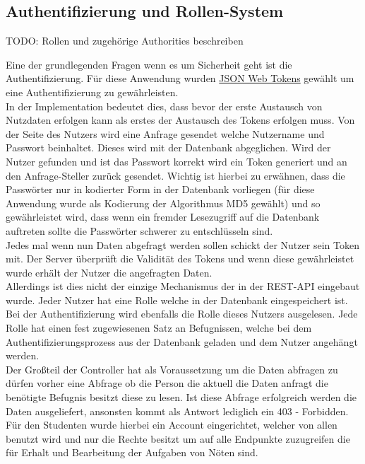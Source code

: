 \subsection{Authentifizierung und Rollen-System} \label{RechteSystem}

TODO: Rollen und zugehörige Authorities beschreiben

Eine der grundlegenden Fragen wenn es um Sicherheit geht ist die Authentifizierung. Für diese Anwendung wurden \hyperref[JWT]{JSON Web Tokens} gewählt um eine Authentifizierung zu gewährleisten. \\
In der Implementation bedeutet dies, dass bevor der erste Austausch von Nutzdaten erfolgen kann als erstes der Austausch des Tokens erfolgen muss. Von der Seite des Nutzers wird eine Anfrage gesendet welche Nutzername und Passwort beinhaltet. Dieses wird mit der Datenbank abgeglichen. Wird der Nutzer gefunden und ist das Passwort korrekt wird ein Token generiert und an den Anfrage-Steller zurück gesendet. Wichtig ist hierbei zu erwähnen, dass die Passwörter nur in kodierter Form in der Datenbank vorliegen (für diese Anwendung wurde als Kodierung der Algorithmus MD5 gewählt) und so gewährleistet wird, dass wenn ein fremder Lesezugriff auf die Datenbank auftreten sollte die Passwörter schwerer zu entschlüsseln sind. \\
Jedes mal wenn nun Daten abgefragt werden sollen schickt der Nutzer sein Token mit. Der Server überprüft die Validität des Tokens und wenn diese gewährleistet wurde erhält der Nutzer die angefragten Daten. \\

Allerdings ist dies nicht der einzige Mechanismus der in der REST-API eingebaut wurde. Jeder Nutzer hat eine Rolle welche in der Datenbank eingespeichert ist. Bei der Authentifizierung wird ebenfalls die Rolle dieses Nutzers ausgelesen. Jede Rolle hat einen fest zugewiesenen Satz an Befugnissen, welche bei dem Authentifizierungsprozess aus der Datenbank geladen und dem Nutzer angehängt werden. \\
Der Großteil der Controller hat als Voraussetzung um die Daten abfragen zu dürfen vorher eine Abfrage ob die Person die aktuell die Daten anfragt die benötigte Befugnis besitzt diese zu lesen. Ist diese Abfrage erfolgreich werden die Daten ausgeliefert, ansonsten kommt als Antwort lediglich ein 403 - Forbidden. \\

Für den Studenten wurde hierbei ein Account eingerichtet, welcher von allen benutzt wird und nur die Rechte besitzt um auf alle Endpunkte zuzugreifen die für Erhalt und Bearbeitung der Aufgaben von Nöten sind. \\

